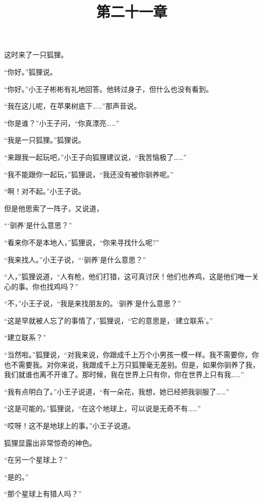 \title{第二十一章}

这时来了一只狐狸。

{\startalignment[center]
 \stopalignment}

“你好。”狐狸说。

“你好。”小王子彬彬有礼地回答。他转过身子，但什么也没有看到。

“我在这儿呢，在苹果树底下\ldots{}\ldots{}”那声音说。

“你是谁？”小王子问，“你真漂亮\ldots{}\ldots{}”

“我是一只狐狸。”狐狸说。

“来跟我一起玩吧，”小王子向狐狸建议说，“我苦恼极了\ldots{}\ldots{}”

“我不能跟你一起玩，”狐狸说，“我还没有被你驯养呢。”

“啊！对不起。”小王子说。

但是他思索了一阵子，又说道，

“‘驯养'是什么意思？”

“看来你不是本地人，”狐狸说，“你来寻找什么呢?”

“我来找人。”小王子说，“‘驯养'是什么意思？”

“人，”狐狸说道，“人有枪，他们打猎，这可真讨厌！他们也养鸡，这是他们唯一关心的事。你也找鸡吗？”

“不，”小王子说，“我是来找朋友的。‘驯养'是什么意思？”

“这是早就被人忘了的事情了，”狐狸说，“它的意思是，‘建立联系'。”

“建立联系？”

“当然啦。”狐狸说，“对我来说，你跟成千上万个小男孩一模一样。我不需要你，你也不需要我。对你来说，我跟成千上万只狐狸毫无差别。但是，如果你驯养了我，我们就谁也离不开谁了。那时候，我在世界上只有你，你在世界上只有我\ldots{}\ldots{}”

“我有点明白了。”小王子说道，“有一朵花，我想，她已经把我驯服了\ldots{}\ldots{}”

“这是可能的。”狐狸说，“在这个地球上，可以说是无奇不有\ldots{}\ldots{}”

“哎呀！这不是地球上的事。”小王子说道。

狐狸显露出非常惊奇的神色。

“在另一个星球上？”

“是的。”

“那个星球上有猎人吗？”

{\startalignment[center]
 \stopalignment}

